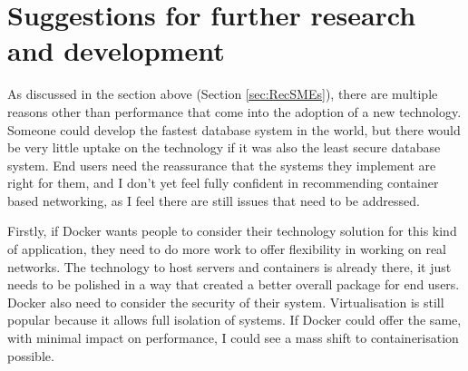 
\section{Suggestions for further research and development}
As discussed in the section above (Section \ref{sec:RecSMEs}), there are multiple reasons other than performance that come into the adoption of a new technology. Someone could develop the fastest database system in the world, but there would be very little uptake on the technology if it was also the least secure database system. End users need the reassurance that the systems they implement are right for them, and I don't yet feel fully confident in recommending container based networking, as I feel there are still issues that need to be addressed.

Firstly, if Docker wants people to consider their technology solution for this kind of application, they need to do more work to offer flexibility in working on real networks. The technology to host servers and containers is already there, it just needs to be polished in a way that created a better overall package for end users. Docker also need to consider the security of their system. Virtualisation is still popular because it allows full isolation of systems. If Docker could offer the same, with minimal impact on performance, I could see a mass shift to containerisation possible.


